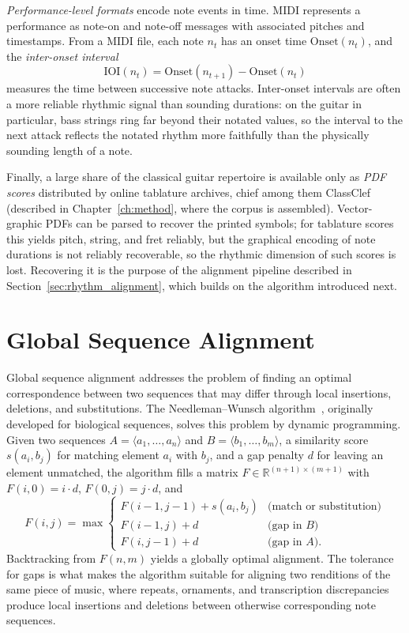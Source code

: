 \emph{Performance-level formats} encode note events in time. MIDI represents a performance as note-on and note-off messages with associated pitches and timestamps. From a MIDI file, each note $n_t$ has an onset time $\mathrm{Onset}(n_t)$, and the \emph{inter-onset interval}
\begin{equation}
    \mathrm{IOI}(n_t) = \mathrm{Onset}(n_{t+1}) - \mathrm{Onset}(n_t)
    \label{eq:ioi}
\end{equation}
measures the time between successive note attacks. Inter-onset intervals are often a more reliable rhythmic signal than sounding durations: on the guitar in particular, bass strings ring far beyond their notated values, so the interval to the next attack reflects the notated rhythm more faithfully than the physically sounding length of a note.

Finally, a large share of the classical guitar repertoire is available only as \emph{PDF scores} distributed by online tablature archives, chief among them ClassClef (described in Chapter~\ref{ch:method}, where the corpus is assembled). Vector-graphic PDFs can be parsed to recover the printed symbols; for tablature scores this yields pitch, string, and fret reliably, but the graphical encoding of note durations is not reliably recoverable, so the rhythmic dimension of such scores is lost. Recovering it is the purpose of the alignment pipeline described in Section~\ref{sec:rhythm_alignment}, which builds on the algorithm introduced next.

\section{Global Sequence Alignment}
\label{sec:prelim_alignment}
Global sequence alignment addresses the problem of finding an optimal correspondence between two sequences that may differ through local insertions, deletions, and substitutions. The Needleman--Wunsch algorithm~\cite{needleman1970general}, originally developed for biological sequences, solves this problem by dynamic programming. Given two sequences $A = \langle a_1, \dots, a_n \rangle$ and $B = \langle b_1, \dots, b_m \rangle$, a similarity score $s(a_i, b_j)$ for matching element $a_i$ with $b_j$, and a gap penalty $d$ for leaving an element unmatched, the algorithm fills a matrix $F \in \mathbb{R}^{(n+1) \times (m+1)}$ with $F(i, 0) = i \cdot d$, $F(0, j) = j \cdot d$, and
\begin{equation}
    F(i, j) = \max
    \begin{cases}
        F(i-1, j-1) + s(a_i, b_j) & \text{(match or substitution)} \\
        F(i-1, j) + d & \text{(gap in } B \text{)} \\
        F(i, j-1) + d & \text{(gap in } A \text{)}.
    \end{cases}
    \label{eq:nw}
\end{equation}
Backtracking from $F(n, m)$ yields a globally optimal alignment. The tolerance for gaps is what makes the algorithm suitable for aligning two renditions of the same piece of music, where repeats, ornaments, and transcription discrepancies produce local insertions and deletions between otherwise corresponding note sequences.

